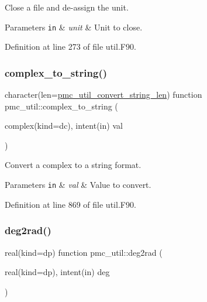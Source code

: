 Close a file and de-\/assign the unit. 


\begin{DoxyParams}[1]{Parameters}
\mbox{\tt in}  & {\em unit} & Unit to close. \\
\hline
\end{DoxyParams}


Definition at line 273 of file util.\+F90.

\mbox{\label{namespacepmc__util_a1c459fd59d9acef65849cc5fd388d386}} 
\subsubsection{\texorpdfstring{complex\+\_\+to\+\_\+string()}{complex\_to\_string()}}
{\footnotesize\ttfamily character(len=\mbox{\hyperlink{namespacepmc__util_afd468d26aef28509c08087ba8e59089a}{pmc\+\_\+util\+\_\+convert\+\_\+string\+\_\+len}}) function pmc\+\_\+util\+::complex\+\_\+to\+\_\+string (\begin{DoxyParamCaption}\item[{complex(kind=dc), intent(in)}]{val }\end{DoxyParamCaption})}



Convert a complex to a string format. 


\begin{DoxyParams}[1]{Parameters}
\mbox{\tt in}  & {\em val} & Value to convert. \\
\hline
\end{DoxyParams}


Definition at line 869 of file util.\+F90.

\mbox{\label{namespacepmc__util_a46d994b9563ad325253e528f983cb3cc}} 
\subsubsection{\texorpdfstring{deg2rad()}{deg2rad()}}
{\footnotesize\ttfamily real(kind=dp) function pmc\+\_\+util\+::deg2rad (\begin{DoxyParamCaption}\item[{real(kind=dp), intent(in)}]{deg }\end{DoxyParamCaption})}



